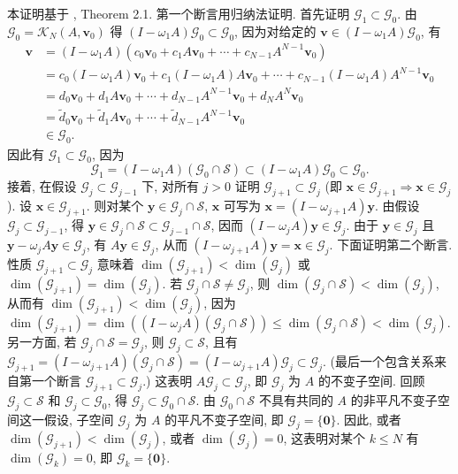 \begin{Proof}
{本证明基于 , Theorem 2.1.}
{第一个断言用归纳法证明. 首先证明 $\mathcal G_1\subset\mathcal G_0$. 由 $\mathcal G_0=\mathcal K_N(A,\bm v_0)$ 得 $(I-\omega_1A)\mathcal G_0\subset\mathcal G_0$, 因为对给定的 $\bm v\in(I-\omega_1A)\mathcal G_0$, 有}
\[\begin{aligned}\bm v&=(I-\omega_1A)(c_0\bm v_0+c_1A\bm v_0+\cdots+c_{N-1}A^{N-1}\bm v_0)\\&=c_0(I-\omega_1A)\bm v_0+c_1(I-\omega_1A)A\bm v_0+\cdots+c_{N-1}(I-\omega_1A)A^{N-1}\bm v_0\\&=d_0\bm v_0+d_1A\bm v_0+\cdots+d_{N-1}A^{N-1}\bm v_0+d_NA^N\bm v_0\\&=\widetilde d_0\bm v_0+\widetilde d_1A\bm v_0+\cdots+\widetilde d_{N-1}A^{N-1}\bm v_0\\&\in\mathcal G_0.\end{aligned}\]
{因此有 $\mathcal G_1\subset\mathcal G_0$, 因为}
\[\mathcal G_1=(I-\omega_1A)(\mathcal G_0\cap\mathcal S)\subset(I-\omega_1A)\mathcal G_0\subset\mathcal G_0.\]
{接着, 在假设 $\mathcal G_j\subset\mathcal G_{j-1}$ 下, 对所有 $j>0$ 证明 $\mathcal G_{j+1}\subset\mathcal G_j$ (即 $\bm x\in\mathcal G_{j+1}\Rightarrow\bm x\in\mathcal G_j$). 设 $\bm x\in\mathcal G_{j+1}$. 则对某个 $\bm y\in\mathcal G_j\cap\mathcal S$, $\bm x$ 可写为 $\bm x=(I-\omega_{j+1}A)\bm y$. 由假设 $\mathcal G_j\subset\mathcal G_{j-1}$, 得 $\bm y\in\mathcal G_j\cap\mathcal S\subset\mathcal G_{j-1}\cap\mathcal S$, 因而 $(I-\omega_jA)\bm y\in\mathcal G_j$. 由于 $\bm y\in\mathcal G_j$ 且 $\bm y-\omega_jA\bm y\in\mathcal G_j$, 有 $A\bm y\in\mathcal G_j$, 从而 $(I-\omega_{j+1}A)\bm y=\bm x\in\mathcal G_j$.}
{下面证明第二个断言. 性质 $\mathcal G_{j+1}\subset\mathcal G_j$ 意味着 $\dim(\mathcal G_{j+1})<\dim(\mathcal G_j)$ 或 $\dim(\mathcal G_{j+1})=\dim(\mathcal G_j)$.}
{若 $\mathcal G_j\cap\mathcal S\ne\mathcal G_j$, 则 $\dim(\mathcal G_j\cap\mathcal S)<\dim(\mathcal G_j)$, 从而有 $\dim(\mathcal G_{j+1})<\dim(\mathcal G_j)$, 因为 $\dim(\mathcal G_{j+1})=\dim((I-\omega_jA)(\mathcal G_j\cap\mathcal S))\le\dim(\mathcal G_j\cap\mathcal S)<\dim(\mathcal G_j)$.}
{另一方面, 若 $\mathcal G_j\cap\mathcal S=\mathcal G_j$, 则 $\mathcal G_j\subset\mathcal S$, 且有 $\mathcal G_{j+1}=(I-\omega_{j+1}A)(\mathcal G_j\cap\mathcal S)=(I-\omega_{j+1}A)\mathcal G_j\subset\mathcal G_j$. (最后一个包含关系来自第一个断言 $\mathcal G_{j+1}\subset\mathcal G_j$.) 这表明 $A\mathcal G_j\subset\mathcal G_j$, 即 $\mathcal G_j$ 为 $A$ 的不变子空间. 回顾 $\mathcal G_j\subset\mathcal S$ 和 $\mathcal G_j\subset\mathcal G_0$, 得 $\mathcal G_j\subset\mathcal G_0\cap\mathcal S$. 由 $\mathcal G_0\cap\mathcal S$ 不具有共同的 $A$ 的非平凡不变子空间这一假设, 子空间 $\mathcal G_j$ 为 $A$ 的平凡不变子空间, 即 $\mathcal G_j=\{\bm0\}$.}
{因此, 或者 $\dim(\mathcal G_{j+1})<\dim(\mathcal G_j)$, 或者 $\dim(\mathcal G_j)=0$, 这表明对某个 $k\le N$ 有 $\dim(\mathcal G_k)=0$, 即 $\mathcal G_k=\{\bm0\}$.}
\par\nopagebreak[4]
\end{Proof}
